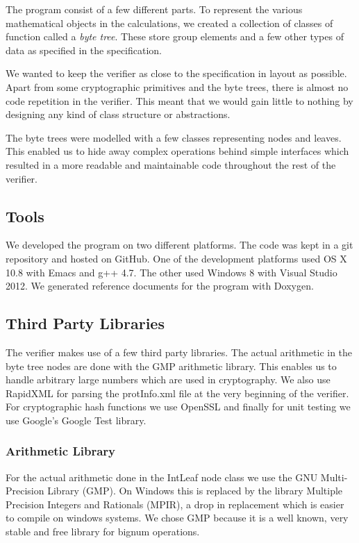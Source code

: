 The program consist of a few different parts. To represent the various
mathematical objects in the calculations, we created a collection of
classes of function called a \emph{byte tree}. These store group
elements and a few other types of data as specified in the
specification.

We wanted to keep the verifier as close to the specification in layout
as possible. Apart from some cryptographic primitives and the byte
trees, there is almost no code repetition in the verifier. This meant
that we would gain little to nothing by designing any kind of class
structure or abstractions.

The byte trees were modelled with a few classes representing nodes and
leaves. This enabled us to hide away complex operations behind simple
interfaces which resulted in a more readable and maintainable code
throughout the rest of the verifier.

\subsection{Tools}

We developed the program on two different platforms. The code was kept
in a git repository and hosted on GitHub. One of the development
platforms used OS X 10.8 with Emacs and g++ 4.7. The other used
Windows 8 with Visual Studio 2012. We generated reference documents
for the program with Doxygen.

\subsection{Third Party Libraries}

The verifier makes use of a few third party libraries. The actual
arithmetic in the byte tree nodes are done with the GMP arithmetic
library. This enables us to handle arbitrary large numbers which are
used in cryptography. We also use RapidXML for parsing the
protInfo.xml file at the very beginning of the verifier. For
cryptographic hash functions we use OpenSSL and finally for unit
testing we use Google's Google Test library.

\subsubsection{Arithmetic Library}

For the actual arithmetic done in the IntLeaf node class we use the
GNU Multi-Precision Library (GMP). On Windows this is replaced by the
library Multiple Precision Integers and Rationals (MPIR), a drop in
replacement which is easier to compile on windows systems. We chose
GMP because it is a well known, very stable and free library for
bignum operations.

